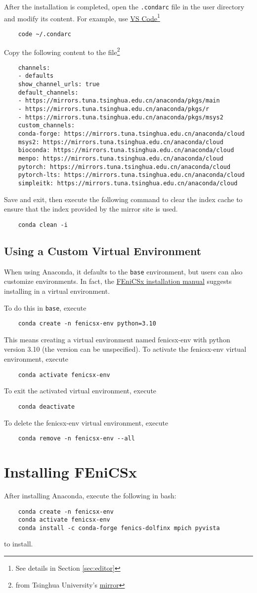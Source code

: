 \documentclass{report}
\begin{document}
After the installation is completed, open the \texttt{.condarc} file in the user directory and modify its content. For example, use \href{https://code.visualstudio.com/}{VS Code}\footnote{See details in Section \ref{sec:editor}}
\begin{lstlisting}
	code ~/.condarc
\end{lstlisting}
Copy the following content to the file\footnote{from Tsinghua University's \href{https://mirrors.tuna.tsinghua.edu.cn/help/anaconda/}{mirror}}
\begin{lstlisting}
	channels:
	- defaults
	show_channel_urls: true
	default_channels:
	- https://mirrors.tuna.tsinghua.edu.cn/anaconda/pkgs/main
	- https://mirrors.tuna.tsinghua.edu.cn/anaconda/pkgs/r
	- https://mirrors.tuna.tsinghua.edu.cn/anaconda/pkgs/msys2
	custom_channels:
	conda-forge: https://mirrors.tuna.tsinghua.edu.cn/anaconda/cloud
	msys2: https://mirrors.tuna.tsinghua.edu.cn/anaconda/cloud
	bioconda: https://mirrors.tuna.tsinghua.edu.cn/anaconda/cloud
	menpo: https://mirrors.tuna.tsinghua.edu.cn/anaconda/cloud
	pytorch: https://mirrors.tuna.tsinghua.edu.cn/anaconda/cloud
	pytorch-lts: https://mirrors.tuna.tsinghua.edu.cn/anaconda/cloud
	simpleitk: https://mirrors.tuna.tsinghua.edu.cn/anaconda/cloud
\end{lstlisting}
Save and exit, then execute the following command to clear the index cache to ensure that the index provided by the mirror site is used.
\begin{lstlisting}
	conda clean -i
\end{lstlisting}

\subsection{Using a Custom Virtual Environment}

When using Anaconda, it defaults to the \texttt{base} environment, but users can also customize environments. In fact, the \href{https://github.com/FEniCS/dolfinx#conda}{FEniCSx installation manual} suggests installing in a virtual environment.

To do this in \texttt{base}, execute
\begin{lstlisting}
	conda create -n fenicsx-env python=3.10
\end{lstlisting}
This means creating a virtual environment named fenicsx-env with python version 3.10 (the version can be unspecified). To activate the fenicsx-env virtual environment, execute
\begin{lstlisting}
	conda activate fenicsx-env
\end{lstlisting}
To exit the activated virtual environment, execute
\begin{lstlisting}
	conda deactivate
\end{lstlisting}
To delete the fenicsx-env virtual environment, execute
\begin{lstlisting}
	conda remove -n fenicsx-env --all
\end{lstlisting}

\section{Installing FEniCSx}

After installing Anaconda, execute the following in \textsf{bash}:
\begin{lstlisting}
	conda create -n fenicsx-env
	conda activate fenicsx-env
	conda install -c conda-forge fenics-dolfinx mpich pyvista
\end{lstlisting}
to install.
\end{document}
